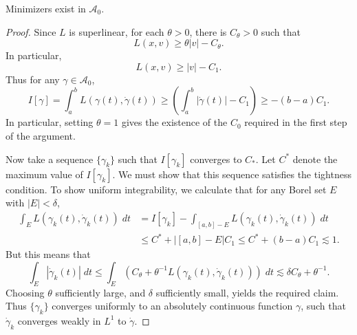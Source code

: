 \begin{theorem}
    Minimizers exist in $\mathcal{A}_0$.
\end{theorem}
\begin{proof}
    Since $L$ is superlinear, for each $\theta > 0$, there is $C_\theta > 0$ such that
    \[ L(x,v) \geq \theta |v| - C_\theta. \]
    In particular,
    \[ L(x,v) \geq |v| - C_1. \]
    Thus for any $\gamma \in \mathcal{A}_0$,
    \[ I[\gamma] = \int_a^b L(\gamma(t), \dot{\gamma}(t)) \geq \left( \int_a^b |\dot{\gamma}(t)| - C_1 \right) \geq -(b-a) C_1. \]
    In particular, setting $\theta = 1$ gives the existence of the $C_0$ required in the first step of the argument.

    Now take a sequence $\{ \gamma_k \}$ such that $I[\gamma_k]$ converges to $C_*$. Let $C^*$ denote the maximum value of $I[\gamma_k]$. We must show that this sequence satisfies the tightness condition. To show uniform integrability, we calculate that for any Borel set $E$ with $|E| < \delta$,
    \begin{align*}
        \int_E L(\gamma_k(t), \dot{\gamma}_k(t))\; dt &= I[\gamma_k] - \int_{[a,b] - E} L(\gamma_k(t), \dot{\gamma}_k(t))\; dt\\
        &\leq C^* + |[a,b] - E| C_1 \leq C^* + (b - a) C_1 \lesssim 1.
    \end{align*}
    But this means that
    \[ \int_E |\dot{\gamma}_k(t)|\; dt \leq \int_E (C_\theta + \theta^{-1} L(\gamma_k(t),\dot{\gamma}_k(t)))\; dt \lesssim \delta C_\theta + \theta^{-1}. \]
    Choosing $\theta$ sufficiently large, and $\delta$ sufficiently small, yields the required claim. Thus $\{ \gamma_k \}$ converges uniformly to an absolutely continuous function $\gamma$, such that $\dot{\gamma}_k$ converges weakly in $L^1$ to $\dot{\gamma}$.


\end{proof}
